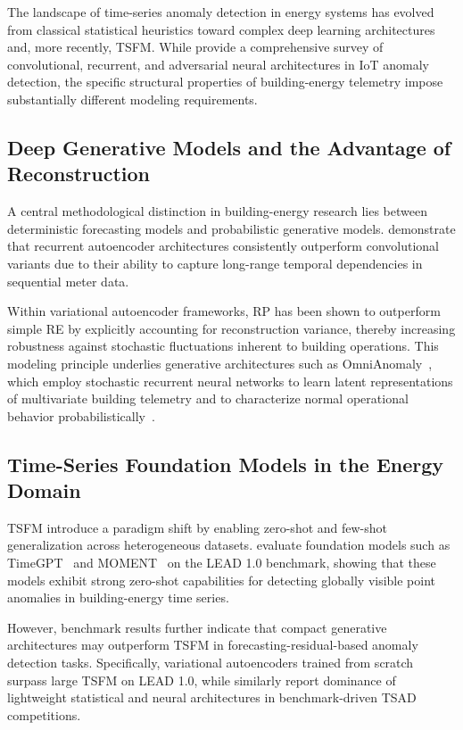 The landscape of time-series anomaly detection in energy systems has evolved from classical
statistical heuristics toward complex deep learning architectures and, more recently, \ac{TSFM}. While \textcite{morshedi2025dl-iot-ad} provide a comprehensive survey of
convolutional, recurrent, and adversarial neural architectures in \ac{IoT} anomaly detection, the
specific structural properties of building-energy telemetry impose substantially different modeling
requirements.

\subsection{Deep Generative Models and the Advantage of Reconstruction}

A central methodological distinction in building-energy research lies between deterministic
forecasting models and probabilistic generative models. \textcite{AZZALINI2025115069} demonstrate
that recurrent autoencoder architectures consistently outperform convolutional variants due to
their ability to capture long-range temporal dependencies in sequential meter data.

Within variational autoencoder frameworks,  \ac{RP} has been shown to
outperform simple  \ac{RE} by explicitly accounting for reconstruction variance,
thereby increasing robustness against stochastic fluctuations inherent to building operations.
This modeling principle underlies generative architectures such as OmniAnomaly~\parencite{su2019robust}, which employ
stochastic recurrent neural networks to learn latent representations of multivariate building
telemetry and to characterize normal operational behavior probabilistically~\parencite{su2019robust}.

\subsection{Time-Series Foundation Models in the Energy Domain}

\ac{TSFM} introduce a paradigm shift by enabling zero-shot and few-shot
generalization across heterogeneous datasets. \textcite{hela2025tsfm-energy-ad} evaluate foundation
models such as TimeGPT~\parencite{garza2023timegpt} and MOMENT~\parencite{goswami2024moment} on the \ac{LEAD 1.0} benchmark, showing that these models exhibit
strong zero-shot capabilities for detecting globally visible point anomalies in building-energy
time series.

However, benchmark results further indicate that compact generative architectures may outperform
\ac{TSFM} in forecasting-residual-based anomaly detection tasks. Specifically, variational
autoencoders trained from scratch surpass large \ac{TSFM} on \ac{LEAD 1.0},
while \textcite{liu2024elephant} similarly report dominance of lightweight statistical and neural
architectures in benchmark-driven \ac{TSAD} competitions.

